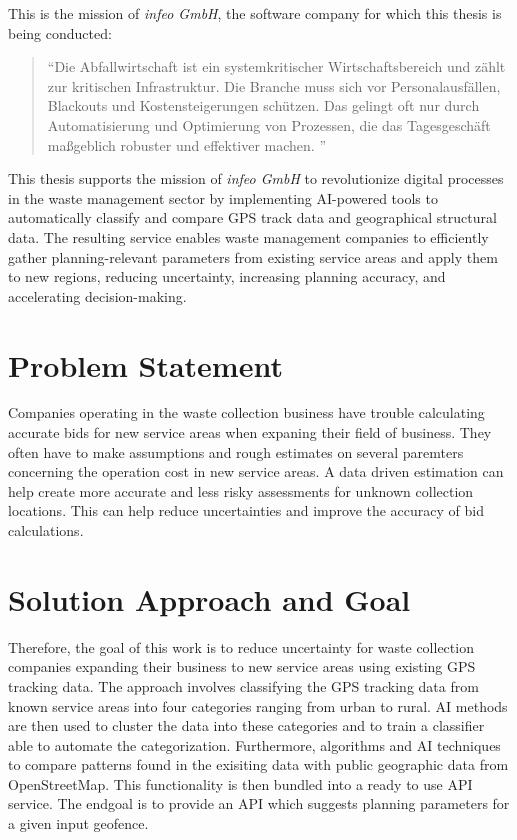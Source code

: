 \documentclass[a4paper,12pt,twoside]{scrreprt}
\begin{document}
This is the mission of \textit{infeo GmbH}, the software company for which this
thesis is being conducted:

\begin{quotation}
  ``Die Abfallwirtschaft ist ein systemkritischer Wirtschaftsbereich und zählt
  zur kritischen Infrastruktur. Die Branche muss sich vor Personalausfällen,
  Blackouts und Kostensteigerungen schützen. Das gelingt oft nur durch
  Automatisierung und Optimierung von Prozessen, die das Tagesgeschäft
  maßgeblich robuster und effektiver machen. ''\cite{noauthor_gemeinsam_nodate}
\end{quotation}

This thesis supports the mission of \textit{infeo GmbH} to revolutionize
digital processes in the
waste management sector by implementing AI-powered tools to automatically
classify and compare GPS track data and geographical structural data. The
resulting service enables waste management companies to efficiently gather
planning-relevant parameters from existing service areas and apply them to new
regions, reducing uncertainty, increasing planning accuracy, and
accelerating decision-making.

\section{Problem Statement}

Companies operating in the waste collection business have trouble calculating
accurate bids for new service areas when expaning their field of business. They
often have to make assumptions and rough estimates on several paremters
concerning the operation cost in new service areas. A data driven estimation
can help create more accurate and less risky assessments for unknown collection
locations. This can help reduce uncertainties and improve the accuracy of bid
calculations.

\section{Solution Approach and Goal}

Therefore, the goal of this work is to reduce uncertainty for waste collection
companies expanding their business to new service areas using existing GPS
tracking data.
The approach involves classifying the GPS tracking data from known service
areas into four categories ranging from urban to rural.
AI methods are then used to cluster the data into these categories and to
train a classifier able to automate the categorization.
Furthermore, algorithms and AI techniques to compare patterns found in the
exisiting data with
public geographic data from OpenStreetMap.
This functionality is then bundled into a
ready to use API service.
The endgoal is to provide an API which suggests planning parameters for a
given input geofence.
\end{document}
